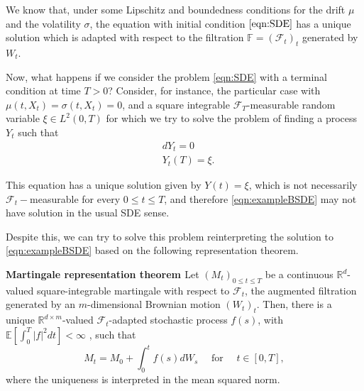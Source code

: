 We know that, under some Lipschitz and boundedness conditions for the drift $\mu$ and the volatility $\sigma$, the equation with initial condition $\eqref{eqn:SDE}$ has a unique solution which is adapted with respect to the filtration $\mathbb{F}=(\mathcal{F}_t)_t$ generated by $W_t$.

Now, what happens if we consider the problem \eqref{eqn:SDE} with a terminal condition at time $T>0$? Consider, for instance, the particular case with $\mu(t,X_t)=\sigma(t,X_t)=0$, and a square integrable $\mathcal{F}_T$-measurable random variable $\xi\in L^2(0,T)$ for which we try to solve the problem of finding a process $Y_t$ such that
\begin{equation}
	\label{eqn:exampleBSDE}
	\begin{split}
		&dY_t=0\\
		&Y_t(T)=\xi.
	\end{split}
\end{equation}

This equation has a unique solution given by $Y(t)=\xi$, which is not necessarily $\mathcal{F}_t-$measurable for every $0\leq t \leq T$, and therefore \eqref{eqn:exampleBSDE} may not have solution in the usual SDE sense. 

Despite this, we can try to solve this problem reinterpreting the solution to \eqref{eqn:exampleBSDE} based on the following representation theorem.
\begin{theorem}
	\label{thm:MRT}
	\textbf{ Martingale representation theorem \cite{mao_stochastic_2008} } Let $(M_t)_{0\leq t \leq T}$ be a continuous $\mathbb{R}^d$-valued square-integrable martingale with respect to $\mathcal{F}_t$, the augmented filtration generated by an $m$-dimensional Brownian motion $(W_t)_t$. Then, there is a unique $\mathbb{R}^{d\times m}$-valued $\mathcal{F}_t$-adapted stochastic process $f(s)$, with $\mathbb{E}[\int_{0}^{T}|f|^2dt]<\infty$ , such that 
	\begin{equation}
		M_t=M_0+\int_{0}^{t}f(s)dW_s \quad \text{ for } \quad t\in [0,T],
	\end{equation}
	where the uniqueness is interpreted in the mean squared norm.
\end{theorem}

